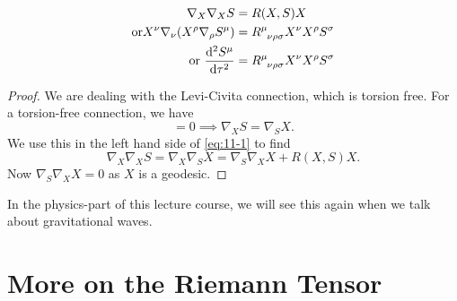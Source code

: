 \begin{claim}
  \begin{align}
    \nabla_{X}\nabla_{X} S &= R(X, S) X \\
    \label{eq:11-1}
    \text{or} X^{\nu} \nabla_{\nu} (X^{\rho} \nabla_{\rho} S^{\mu}) &= R \indices{^{\mu}_{\nu\rho\sigma}} X^{\nu}X^{\rho} S^{\sigma} \\
    \text{or } \dv[2]{S^{\mu}}{\tau} &= R \indices{^{\mu}_{\nu\rho\sigma}} X^{\nu}X^{\rho} S^{\sigma}
  \end{align}
\end{claim}
\begin{proof}
  We are dealing with the Levi-Civita connection, which is torsion free. For a torsion-free connection, we have
  \begin{equation}
    [X, S] = 0 \implies \nabla_{X}S = \nabla_{S}X.
  \end{equation}
  We use this in the left hand side of \eqref{eq:11-1} to find
  \begin{equation}
    \nabla_{X} \nabla_{X} S = \nabla_{X} \nabla_{S} X = \nabla_{S} \nabla_{X} X + R(X, S) X.
  \end{equation}
  Now $\nabla_{S} \nabla_{X} X = 0$ as $X$ is a geodesic.
\end{proof}
\begin{leftbar}
  \begin{remark}
    In the physics-part of this lecture course, we will see this again when we talk about gravitational waves.
  \end{remark}
\end{leftbar}

\section{More on the Riemann Tensor}%
\label{sec:more_on_the_riemann_tensor}

